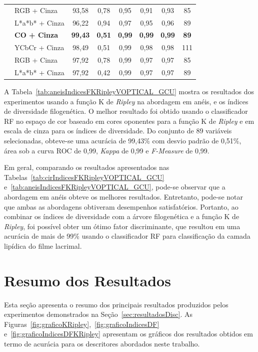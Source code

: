 \begin{table}[!ht]
{\begin{tabular}{llcccccc}
 & RGB + Cinza & 93,58 & 0,78 & 0,95 & 0,91 & 0,93 & 85 \\
 & L*a*b* + Cinza & 96,22 & 0,94 & 0,97 & 0,95 & 0,96 & 89 \\ \cline{2-8} \parbox[t]{4mm}{}
 & \textbf{CO + Cinza}  & \textbf{99,43}  & \textbf{0,51}  & \textbf{0,99}  & \textbf{0,99}  & \textbf{0,99}  & \textbf{89}  \\
 & YCbCr + Cinza & 98,49 & 0,51 & 0,99 & 0,98 & 0,98 & 111 \\
 & RGB + Cinza & 97,92 & 0,78 & 0,99 & 0,97 & 0,97 & 85 \\
 & L*a*b* + Cinza & 97,92 & 0,42 & 0,99 & 0,97 & 0,97 & 89 \\  
\end{tabular}
}
\end{table}

A Tabela~\ref{tab:aneisIndicesFKRipleyVOPTICAL_GCU} mostra os resultados dos experimentos usando a função K de \textit{Ripley} na abordagem em anéis, e os índices de diversidade filogenética. O melhor resultado foi obtido usando o classificador RF no espaço de cor baseado em cores oponentes para a função K de \textit{Ripley} e em escala de cinza para os índices de diversidade. Do conjunto de 89 variáveis selecionadas, obteve-se uma acurácia de 99,43\% com desvio padrão de 0,51\%, área sob a curva ROC de 0,99, \textit{Kappa} de 0,99 e \textit{F-Measure} de 0,99.

Em geral, comparando os resultados apresentados nas Tabelas~\ref{tab:cirIndicesFKRipleyVOPTICAL_GCU} e~\ref{tab:aneisIndicesFKRipleyVOPTICAL_GCU}, pode-se observar que a abordagem em anéis obteve os melhores resultados. Entretanto, pode-se notar que ambas as abordagens obtiveram desempenhos satisfatórios. Portanto, ao combinar os índices de diversidade com a árvore filogenética e a função K de \textit{Ripley}, foi possível obter um ótimo fator discriminante, que resultou em uma acurácia de mais de 99\% usando o classificador RF para classificação da camada lipídica do filme lacrimal.

\section{Resumo dos Resultados}

Esta seção apresenta o resumo dos principais resultados produzidos pelos experimentos demonstrados na Seção~\ref{sec:resultadosDisc}. As Figuras~\ref{fig:graficoKRipley},~\ref{fig:graficoIndicesDF} e~\ref{fig:graficoIndicesDFKRipley} apresentam os gráficos dos resultados obtidos em termo de acurácia para os descritores abordados neste trabalho.

